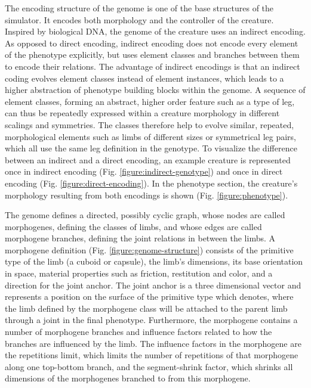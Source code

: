 \documentclass[main]{subfiles}
\begin{document}
The encoding structure of the genome is one of the base structures of the simulator. %
%
It encodes both morphology and the controller of the creature. %
%
Inspired by biological DNA, the genome of the creature uses an indirect encoding. %
%
As opposed to direct encoding, indirect encoding does not encode every element of the phenotype explicitly, but uses element classes and branches between them to encode their relations. %
%
The advantage of indirect encodings is that an indirect coding evolves element classes instead of element instances, which leads to a higher abstraction of phenotype building blocks within the genome. %
%
A sequence of element classes, forming an abstract, higher order feature such as a type of leg, can thus be repeatedly expressed within a creature morphology in different scalings and symmetries. %
%
The classes therefore help to evolve similar, repeated, morphological elements such as limbs of different sizes or symmetrical leg pairs, which all use the same leg definition in the genotype. %
%
To visualize the difference between an indirect and a direct encoding, an example creature is represented once in indirect encoding (Fig. \ref{figure:indirect-genotype}) and once in direct encoding (Fig. \ref{figure:direct-encoding}). %
%
In the phenotype section, the creature's morphology resulting from both encodings is shown (Fig. \ref{figure:phenotype}). %

The genome defines a directed, possibly cyclic graph, whose nodes are called morphogenes, defining the classes of limbs, and whose edges are called morphogene branches, defining the joint relations in between the limbs. %
%
A morphogene definition (Fig. \ref{figure:genome-structure}) consists of the primitive type of the limb (a cuboid or capsule), the limb's dimensions, its base orientation in space, material properties such as friction, restitution and color, and a direction for the joint anchor. %
%
The joint anchor is a three dimensional vector and represents a position on the surface of the primitive type which denotes, where the limb defined by the morphogene class will be attached to the parent limb through a joint in the final phenotype. %
%
Furthermore, the morphogene contains a number of morphogene branches and influence factors related to how the branches are influenced by the limb. %
%
The influence factors in the morphogene are the repetitions limit, which limits the number of repetitions of that morphogene along one top-bottom branch, and the segment-shrink factor, which shrinks all dimensions of the morphogenes branched to from this morphogene.
\end{document}
